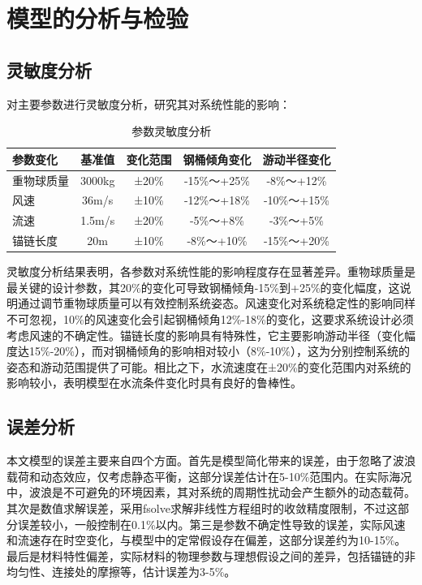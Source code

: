 \documentclass[withoutpreface,bwprint]{cumcmthesis}
\begin{document}
\section{模型的分析与检验}

\subsection{灵敏度分析}

对主要参数进行灵敏度分析，研究其对系统性能的影响：

\begin{table}[H]
\centering
\begin{tabular}{lcccc}
\toprule
参数变化 & 基准值 & 变化范围 & 钢桶倾角变化 & 游动半径变化 \\
\midrule
重物球质量 & 3000kg & ±20\% & -15\%～+25\% & -8\%～+12\% \\
风速 & 36m/s & ±10\% & -12\%～+18\% & -10\%～+15\% \\
流速 & 1.5m/s & ±20\% & -5\%～+8\% & -3\%～+5\% \\
锚链长度 & 20m & ±10\% & -8\%～+10\% & -15\%～+20\% \\
\bottomrule
\end{tabular}
\caption{参数灵敏度分析}
\label{tab:灵敏度}
\end{table}

灵敏度分析结果表明，各参数对系统性能的影响程度存在显著差异。重物球质量是最关键的设计参数，其20\%的变化可导致钢桶倾角-15\%到+25\%的变化幅度，这说明通过调节重物球质量可以有效控制系统姿态。风速变化对系统稳定性的影响同样不可忽视，10\%的风速变化会引起钢桶倾角12\%-18\%的变化，这要求系统设计必须考虑风速的不确定性。锚链长度的影响具有特殊性，它主要影响游动半径（变化幅度达15\%-20\%），而对钢桶倾角的影响相对较小（8\%-10\%），这为分别控制系统的姿态和游动范围提供了可能。相比之下，水流速度在±20\%的变化范围内对系统的影响较小，表明模型在水流条件变化时具有良好的鲁棒性。

\subsection{误差分析}

本文模型的误差主要来自四个方面。首先是模型简化带来的误差，由于忽略了波浪载荷和动态效应，仅考虑静态平衡，这部分误差估计在5-10\%范围内。在实际海况中，波浪是不可避免的环境因素，其对系统的周期性扰动会产生额外的动态载荷。其次是数值求解误差，采用fsolve求解非线性方程组时的收敛精度限制，不过这部分误差较小，一般控制在0.1\%以内。第三是参数不确定性导致的误差，实际风速和流速存在时空变化，与模型中的定常假设存在偏差，这部分误差约为10-15\%。最后是材料特性偏差，实际材料的物理参数与理想假设之间的差异，包括锚链的非均匀性、连接处的摩擦等，估计误差为3-5\%。
\end{document}
